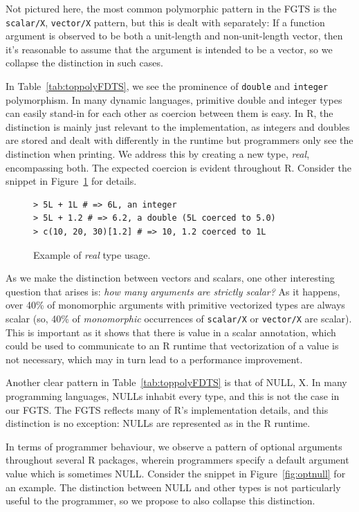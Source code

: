 \documentclass[acmsmall,10pt,review,anonymous]{acmart}\settopmatter{printfolios=true,printccs=false,printacmref=false}
\begin{document}
Not pictured here, the most common polymorphic pattern in the FGTS is the {\tt scalar/X}, {\tt vector/X} pattern, but this is dealt with separately:
If a function argument is observed to be both a unit-length and non-unit-length vector, then it's reasonable to assume that the argument is intended to be a vector, so we collapse the distinction in such cases.

In Table~\ref{tab:toppolyFDTS}, we see the prominence of {\tt double} and {\tt integer} polymorphism.
In many dynamic languages, primitive double and integer types can easily stand-in for each other as coercion between them is easy.
In R, the distinction is mainly just relevant to the implementation, as integers and doubles are stored and dealt with differently in the runtime but programmers only see the distinction when printing.
We address this by creating a new type, {\it real}, encompassing both.
The expected coercion is evident throughout R.
Consider the snippet in Figure~\ref{fig:realex} for details.
\begin{figure}[!hb]{\small\begin{lstlisting}[style=R]
> 5L + 1L # => 6L, an integer
> 5L + 1.2 # => 6.2, a double (5L coerced to 5.0)
> c(10, 20, 30)[1.2] # => 10, 1.2 coerced to 1L
\end{lstlisting}}\caption{Example of {\it real} type usage.}\label{fig:realex}\end{figure}

As we make the distinction between vectors and scalars, one other interesting question that arises is: {\it how many arguments are strictly scalar?}
As it happens, over 40\% of monomorphic arguments with primitive vectorized types are always scalar (so, 40\% of {\it monomorphic} occurrences of {\tt scalar/X} or {\tt vector/X} are scalar).
This is important as it shows that there is value in a scalar annotation, which could be used to communicate to an R runtime that vectorization of a value is not necessary, which may in turn lead to a performance improvement.

Another clear pattern in Table~\ref{tab:toppolyFDTS} is that of NULL, X.
In many programming languages, NULLs inhabit every type, and this is not the case in our FGTS.
The FGTS reflects many of R's implementation details, and this distinction is no exception:
NULLs are represented as  in the R runtime.

In terms of programmer behaviour, we observe a pattern of optional arguments throughout several R packages, wherein programmers specify a default argument value which is sometimes NULL.
Consider the snippet in Figure~\ref{fig:optnull} for an example.
The distinction between NULL and other types is not particularly useful to the programmer, so we propose to also collapse this distinction.
\end{document}
